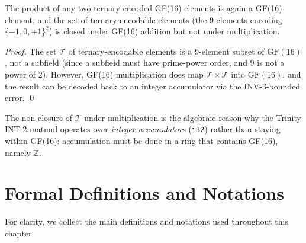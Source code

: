 \begin{lemma}
\label{lem:ternary-closure}
The product of any two ternary-encoded GF(16) elements is again
a GF(16) element, and the set of ternary-encodable elements
(the 9 elements encoding \(\{-1,0,+1\}^2\)) is closed under
GF(16) addition but not under multiplication.
\end{lemma}

\begin{proof}
The set \(\mathcal{T}\) of ternary-encodable elements is a 9-element subset
of \(\mathrm{GF}(16)\), not a subfield (since a subfield must have
prime-power order, and 9 is not a power of 2).
However, GF(16) multiplication does map \(\mathcal{T}\times\mathcal{T}\)
into \(\mathrm{GF}(16)\), and the result can be decoded back to an
integer accumulator via the INV-3-bounded error.
\qed
\end{proof}

\begin{remark}
The non-closure of \(\mathcal{T}\) under multiplication is the
algebraic reason why the Trinity INT-2 matmul operates over
\emph{integer accumulators} (\texttt{i32}) rather than staying within
GF(16): accumulation must be done in a ring that contains GF(16),
namely \(\mathbb{Z}\).
\end{remark}

\section{Formal Definitions and Notations}
\label{sec:gf16-notation}

For clarity, we collect the main definitions and notations used throughout
this chapter.

